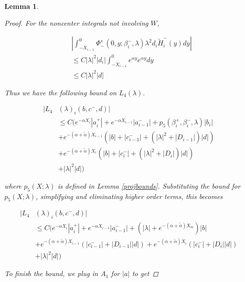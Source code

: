 \documentclass[12pt]{article}
\newtheorem{lemma}{Lemma}
\begin{document}
\begin{lemma}
\begin{proof}
For the noncenter integrals not involving $W$,

\begin{align*}
&\left| \int_{-X_{i-1}}^0
\Phi^s_-(0, y; \beta_i^-, \lambda) \lambda^2 d_i \tilde{H}_i^-(y) dy \right| \\
&\leq C |\lambda|^2 |d_i| \int_{-X_{i-1}}^0 e^{\alpha y} e^{\alpha y} dy \\
&\leq C |\lambda|^2 |d| 
\end{align*}

Thus we have the following bound on $L_4(\lambda)$. 

\begin{align*}
|L_4&(\lambda)_i(b, c^-, d)|\\ 
&\leq C \Big( e^{-\alpha X_i} |a_i^+| +  e^{-\alpha X_{i-1}} |a_{i-1}^-| + p_5(\beta_i^+, \beta_i^-, \lambda) |b_i| \\
&+ e^{-(\alpha + \tilde{\alpha}) X_{i-1}}( |b| + |c_{i-1}^-| + (|\lambda|^2 + |D_{i-1}|)|d| ) \\
&+ e^{-(\alpha + \tilde{\alpha}) X_i}( |b| + |c_i^-| + (|\lambda|^2 + |D_i|)|d| ) \\
&+ |\lambda|^2 |d|  \Big)
\end{align*}

where $p_5(X; \lambda)$ is defined in Lemma \ref{projbounds}. Substituting the bound for $p_5(X; \lambda)$, simplifying and eliminating higher order terms, this becomes

\begin{align*}
|L_4&(\lambda)_i(b, c^-, d)|\\ 
&\leq C \Big( e^{-\alpha X_i} |a_i^+| +  e^{-\alpha X_{i-1}} |a_{i-1}^-| +(|\lambda| + e^{-(\alpha + \tilde{\alpha}) X_m})|b| \\
&+ e^{-(\alpha + \tilde{\alpha}) X_{i-1}}( |c_{i-1}^-| + |D_{i-1}||d| ) 
+ e^{-(\alpha + \tilde{\alpha}) X_i}( |c_i^-| + |D_i||d| ) \\
&+ |\lambda|^2 |d| \Big)
\end{align*}

To finish the bound, we plug in $A_1$ for $|a|$ to get


\end{proof}
\end{lemma}
\end{document}
